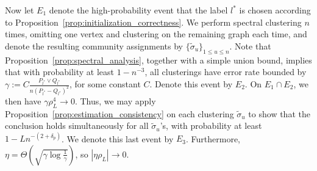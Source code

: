 \documentclass{article}
\begin{document}
Now let $E_1$ denote the high-probability event that the label $l^*$ is chosen according to Proposition~\ref{prop:initialization_correctness}. We perform spectral clustering $n$ times, omitting one vertex and clustering on the remaining graph each time, and denote the resulting community assignments by $\{\tilde \sigma_u\}_{1 \le u \le n}$. Note that Proposition~\ref{prop:spectral_analysis}, together with a simple union bound, implies that with probability at least $1-n^{-3}$, all clusterings have error rate bounded by $\gamma :=  C\frac{ P_{l^*} \vee Q_{l^*}}{ n ( P_{l^*} - Q_{l^*} )^2}$, for some constant $C$. Denote this event by $E_2$. On $E_1 \cap E_2$, we then have $\gamma \rho_L^4 \rightarrow 0$. Thus, we may apply Proposition~\ref{prop:estimation_consistency} on each clustering $\tilde{\sigma}_u$ to show that the conclusion holds simultaneously for all $\tilde{\sigma}_u$'s, with probability at least $1 - Ln^{-(2 + \delta_p)}$. We denote this last event by $E_3$. Furthermore, $\eta = \Theta \left( \sqrt{\gamma \log \frac{1}{\gamma} } \right)$, so $|\eta \rho_L| \rightarrow 0$.
\end{document}
